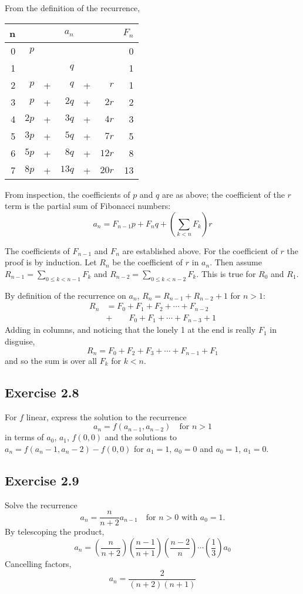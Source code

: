 \documentclass[11pt, oneside]{article}   	%
\begin{document}
From the definition of the recurrence,

\begin{tabular}{r | r c r c r | r}
	n	& & & $a_n$ & & 				& $F_n$\\
	\hline
	0	&  $p$ & & & &						& 0 \\
	1	& & & $q$ & &						& 1 \\
	2	& $p$ & {}+{} & $q$ & {}+{} & $r$		& 1 \\
	3	& $p$ & {}+{} & $2q$ & {}+{} & $2r$ 		& 2\\
	4	& $2p$ & {}+{} & $3q$ & {}+{} & $4r$		& 3 \\
	5	& $3p$ & {}+{} & $5q$ & {}+{} & $7r$  	& 5 \\
	6	& $5p$ & {}+{} & $8q$ & {}+{} & $12r$	& 8 \\
	7	& $8p$ & {}+{} & $13q$ & {}+{} & $20r$	& 13

\end{tabular}

From inspection, the coefficients of $p$ and $q$ are as above; the coefficient of the $r$ term is the partial sum of Fibonacci numbers:
\[
	a_n = F_{n-1}p + F_n q + \left(\sum_{k<n} F_k \right) r
\]

The coefficients of $F_{n-1}$ and $F_n$ are established above.  For the coefficient of $r$ the proof is by induction. Let $R_n$ be the coefficient
of $r$ in $a_n$. Then assume $R_{n-1} = \sum_{0 \le k < n-1} F_k$ and $R_{n-2} = \sum_{0 \le k < n-2} F_k$. This is true for $R_0$ and $R_1$.

By definition of the recurrence on $a_n$, $R_n = R_{n-1} + R_{n-2} + 1$ for $n>1$:
\begin{align*}
	R_n &= F_0 + F_1 + F_2 + \cdots + F_{n-2}  \\
		&+ \qquad  F_0 + F_1 +  \cdots + F_{n-3} +  1
\end{align*}
Adding in columns, and noticing that the lonely 1 at the end is really $F_1$ in disguise,
\[
	R_n = F_0 + F_2 + F_3 + \cdots + F_{n-1} + F_1
\]
and so the sum is over all $F_k$ for $k < n$.

\subsection*{Exercise 2.8}
For $f$ linear, express the solution to the recurrence
\[
	a_n = f(a_{n-1}, a_{n-2}) \quad \text{for $n>1$}
\]
in terms of $a_0$, $a_1$, $f(0,0)$ and the solutions to $a_n = f(a_n-1, a_n-2) - f(0,0)$ for $a_1=1$, $a_0=0$ and $a_0=1$, $a_1=0$.

\subsection*{Exercise 2.9}
Solve the recurrence 
\[
	a_n = \frac{n}{n+2}a_{n-1} \quad \text{for $n>0$ with $a_0=1$.}
\]
By telescoping the product,
\[
	a_n = \left(\frac{n}{n+2}\right)  \left(\frac{n-1}{n+1}\right)  \left(\frac{n-2}{n}\right)  \cdots \left(\frac{1}{3}\right) a_0
\]
Cancelling factors,
\[
	a_n = \frac{2}{(n+2)(n+1)}
\]
\end{document}
